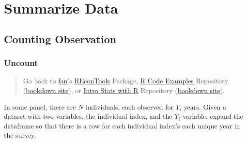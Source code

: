 \documentclass[
]{book}
\newenvironment{Shaded}{\begin{snugshade}}{\end{snugshade}}
\newcommand{\CommentTok}[1]{\textcolor[rgb]{0.56,0.35,0.01}{\textit{#1}}}
\newcommand{\KeywordTok}[1]{\textcolor[rgb]{0.13,0.29,0.53}{\textbf{#1}}}
\newcommand{\NormalTok}[1]{#1}
\newcommand{\OperatorTok}[1]{\textcolor[rgb]{0.81,0.36,0.00}{\textbf{#1}}}
\newcommand{\StringTok}[1]{\textcolor[rgb]{0.31,0.60,0.02}{#1}}
\begin{document}
\begin{Shaded}
\end{Shaded}

\hypertarget{summarize-data}{%
\chapter{Summarize Data}\label{summarize-data}}

\hypertarget{counting-observation}{%
\section{Counting Observation}\label{counting-observation}}

\hypertarget{uncount}{%
\subsection{Uncount}\label{uncount}}

\begin{quote}
Go back to \href{http://fanwangecon.github.io/}{fan}'s \href{https://fanwangecon.github.io/REconTools/}{REconTools} Package, \href{https://fanwangecon.github.io/R4Econ/}{R Code Examples} Repository (\href{https://fanwangecon.github.io/R4Econ/bookdown}{bookdown site}), or \href{https://fanwangecon.github.io/Stat4Econ/}{Intro Stats with R} Repository (\href{https://fanwangecon.github.io/Stat4Econ/bookdown}{bookdown site}).
\end{quote}

In some panel, there are \(N\) individuals, each observed for \(Y_i\) years. Given a dataset with two variables, the individual index, and the \(Y_i\) variable, expand the dataframe so that there is a row for each individual index's each unique year in the survey.
\end{document}
